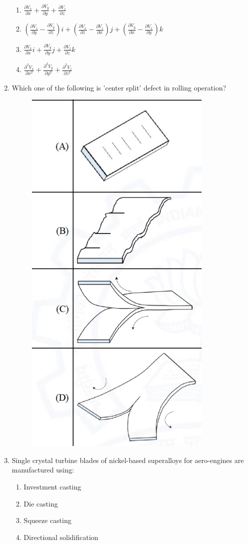\documentclass[journal]{IEEEtran}
\theoremstyle{remark}
\begin{document}
\begin{enumerate}
\begin{multicols}{2}
\begin{enumerate}
\item $\frac{\partial V_{x}}{\partial x}+\frac{\partial V_{y}}{\partial y}+\frac{\partial V_{z}}{\partial z}$
\item $(\frac{\partial V_{z}}{\partial y}-\frac{\partial V_{y}}{\partial z})i+(\frac{\partial V_{x}}{\partial z}-\frac{\partial V_{z}}{\partial x})j+(\frac{\partial V_{y}}{\partial x}-\frac{\partial V_{x}}{\partial y})k$
\item $\frac{\partial V_{x}}{\partial x}i+\frac{\partial V_{y}}{\partial y}j+\frac{\partial V_{z}}{\partial z}k$
\item $\frac{\partial^{2}V_{x}}{\partial x^{2}}+\frac{\partial^{2}V_{y}}{\partial y^{2}}+\frac{\partial^{2}V_{z}}{\partial z^{2}}$
\end{enumerate}
\end{multicols}
\item Which one of the following is 'center split' defect in rolling operation? \hfill{}
\begin{figure}[H]
    \centering
    \includegraphics[width=0.3\columnwidth]{figs/Q.4.png}
    \caption{}
    \label{fig:placeholder}
\end{figure}


\item Single crystal turbine blades of nickel-based superalloys for aero-engines are manufactured using: \hfill{}
\begin{multicols}{2}
\begin{enumerate}
\item Investment casting
\item Die casting
\item Squeeze casting
\item Directional solidification
\end{enumerate}
\end{multicols}


\end{enumerate}
\end{document}
